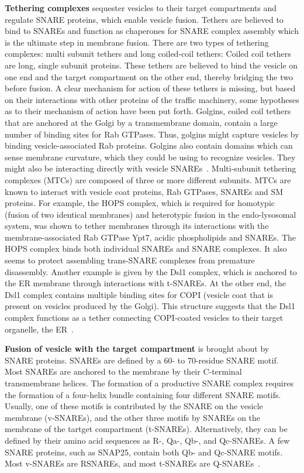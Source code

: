 	 \textbf{Tethering complexes} sequester vesicles to their target compartments and regulate SNARE
		proteins, which enable vesicle fusion. 
		Tethers are believed to bind to SNAREs and function as
		chaperones for SNARE complex assembly which is the ultimate step in membrane fusion. 
		There are two types of tethering complexes: multi subunit tethers and long coiled-coil tethers:
%		
 Coiled coil tethers are long, single subunit proteins. 
			These tethers are believed to bind the
			vesicle on one end and the target compartment on the other end, thereby bridging the two before
			fusion.
			A clear mechanism for action of these tethers is missing, but based on their interactions with
			other proteins of the traffic machinery, some hypotheses as to their mechanism of action have been
			put forth. 
			Golgins, coiled coil tethers that are anchored at the Golgi by a transmembrane domain, contain a large number of binding sites for Rab GTPases. 
			Thus, golgins might capture vesicles by
			binding vesicle-associated Rab proteins. 
			Golgins also contain domains which can sense membrane
			curvature, which they could be using to recognize vesicles. 
			They might also be interacting directly
			with vesicle SNAREs~\cite{baker2016chaperoning}.
			Multi-subunit tethering complexes (MTCs) are composed of three or more different
			subunits.
			MTCs are known to interact with vesicle coat proteins, Rab GTPases, SNAREs and SM proteins.
			For example, the HOPS complex, which is required for homotypic (fusion of two identical
			membranes) and heterotypic fusion in the endo-lysosomal system, was shown to tether membranes
			through its interactions with the membrane-associated Rab GTPase Ypt7, acidic phospholipids and
			SNAREs. 
			The HOPS complex binds both individual SNAREs and SNARE complexes. It also
			seems to protect assembling trans-SNARE complexes from premature disassembly. 
			Another example is given by the Dsl1 complex, which is anchored to the ER membrane through interactions
			with t-SNAREs. 
			At the other end, the Dsl1 complex contains multiple binding sites for COPI
			(vesicle coat that is present on vesicles produced by the Golgi). 
			This structure suggests that the Dsl1
			complex functions as a tether connecting COPI-coated vesicles to their target organelle, the ER~\cite{baker2016chaperoning}.
			

	
	 \textbf{Fusion of vesicle with the target compartment} is brought about by SNARE proteins. 
	SNAREs
	are defined by a 60- to 70-residue SNARE motif. Most SNAREs are anchored to the membrane by
	their C-terminal transmembrane helices. 
	The formation of a productive SNARE complex requires
	the formation of a four-helix bundle containing four different SNARE motifs. Usually, one of these
	motifs is contributed by the SNARE on the vesicle membrane (v-SNAREs), and the other three
	motifs by SNAREs on the membrane of the tartget compartment (t-SNAREs). 
	Alternatively, they
	can be defined by their amino acid sequences as R-, Qa-, Qb-, and Qc-SNAREs. A few SNARE
	proteins, such as SNAP25, contain both Qb- and Qc-SNARE motifs.
	Most v-SNAREs are RSNAREs, and most t-SNAREs are Q-SNAREs~\cite{yoon2018snare}.
	
